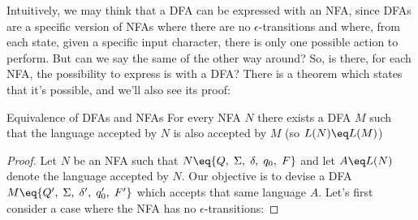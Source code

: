 \begin{example}
    \begin{center}
    \end{center}
\end{example}

Intuitively, we may think that a DFA can be expressed with an NFA, since DFAs are a specific version of NFAs where there are no $\epsilon$-transitions and where, from each state, given a specific input character, there is only one possible action to perform. But can we say the same of the other way around? So, is there, for each NFA, the possibility to express is with a DFA? There is a theorem which states that it's possible, and we'll also see its proof:

\begin{theorem}{Equivalence of DFAs and NFAs}
    For every NFA $N$ there exists a DFA $M$ such that the language accepted by $N$ is also accepted by $M$ (so $L(N) \eq L(M)$)

    \begin{proof}
        Let $N$ be an NFA such that $N \eq \{Q, \; \Sigma, \; \delta, \; q_0, \; F \}$ and let $A \eq L(N)$ denote the language accepted by $N$. Our objective is to devise a DFA $M \eq \{Q', \; \Sigma, \; \delta', \; q_0', \; F' \}$ which accepts that same language $A$.
        \nl
        Let's first consider a case where the NFA has no $\epsilon$-transitions: 
    \end{proof}
\end{theorem}